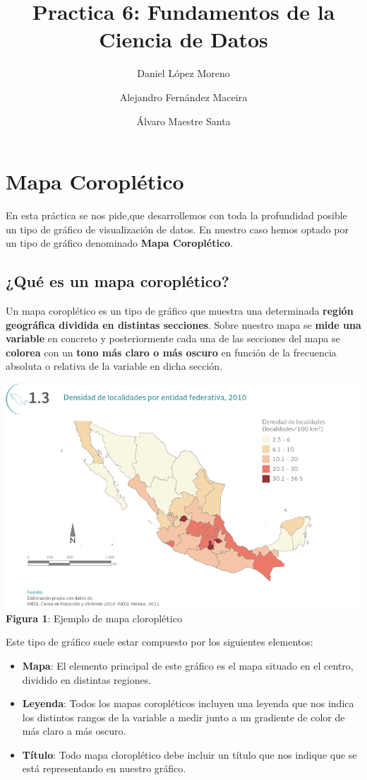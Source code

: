 \documentclass [a4paper] {article}
\title{Practica 6: Fundamentos de la Ciencia de Datos}
\author{
  Daniel López Moreno\\
  \and
  Alejandro Fernández Maceira\\
  \and
  Álvaro Maestre Santa
}
\begin{document}
\maketitle

\section{Mapa Coroplético}

En esta práctica se nos pide,que desarrollemos con toda la profundidad posible un tipo de 
gráfico de visualización de datos. En nuestro caso hemos optado por un tipo de gráfico
denominado \textbf{Mapa Coroplético}.

\subsection{¿Qué es un mapa coroplético?}

Un mapa coroplético es un tipo de gráfico que muestra una determinada \textbf{región geográfica dividida 
en distintas secciones}. Sobre nuestro mapa se \textbf{mide una variable} en concreto y posteriormente
cada una de las secciones del mapa se \textbf{colorea} con un \textbf{tono más claro o más oscuro} en función de la
frecuencia absoluta o relativa de la variable en dicha sección.

\begin{center}
  \centering\includegraphics{mapacloropletico.png}
  \\\textbf{Figura 1}: Ejemplo de mapa cloroplético 
\end{center}


Este tipo de gráfico suele estar compuesto por los siguientes elementos:
\begin{itemize} 
  \item \textbf{Mapa}: El elemento principal de este gráfico es el mapa situado en el centro, dividido en distintas
  regiones.
  \item \textbf{Leyenda}: Todos los mapas coropléticos incluyen una leyenda que nos indica los distintos rangos de 
  la variable a medir junto a un gradiente de color de más claro a más oscuro.
  \item \textbf{Título}: Todo mapa cloroplético debe incluir un título que nos indique que se está representando en
  nuestro gráfico.
\end{itemize}
\end{document}
